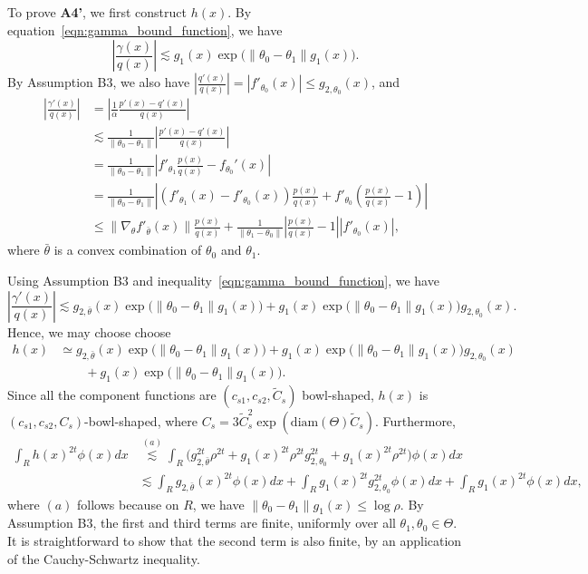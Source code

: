 \documentclass{article}
\begin{document}
To prove \textbf{A4'}, we first construct $h(x)$. By equation~\ref{eqn:gamma_bound_function}, we have
\[
\left| \frac{\gamma(x)}{q(x)} \right| \lesssim
     g_1(x) \exp\Big( \|\theta_0 - \theta_1 \|  g_1(x) \Big).
\]
By Assumption B3, we also have $\left| \frac{q'(x)}{q(x)} \right| = |f'_{\theta_0}(x)| \leq g_{2, \theta_0}(x)$, and
\begin{align*}
\left| \frac{\gamma'(x) }{q(x)} \right| &=
    \left| \frac{1}{\alpha} \frac{p'(x) - q'(x)}{q(x)} \right| \\
%
&\lesssim \frac{1}{\| \theta_0 - \theta_1 \|}\left| \frac{p'(x) - q'(x)}{q(x)}\right|\\
%
& =  \frac{1}{\| \theta_0 - \theta_1 \|} \left|
           f'_{\theta_1} \frac{p(x)}{q(x)} - f_{\theta_0}'(x) \right| \\
  &= \frac{1}{\|\theta_0 - \theta_1\|} \left| 
          ( f'_{\theta_1}(x) - f'_{\theta_0}(x) ) \frac{p(x)}{q(x)} 
       + f'_{\theta_0} \left( \frac{p(x)}{q(x)} - 1 \right) \right| \\
  &\leq \| \nabla_{\theta} f'_{\bar{\theta}}(x) \| \frac{p(x)}{q(x)} 
         + \frac{1}{\| \theta_1 - \theta_0\|} 
        \left| \frac{p(x)}{q(x)} - 1 \right|  |f'_{\theta_0}(x)|,
\end{align*}
where $\bar{\theta}$ is a convex combination of $\theta_0$ and $\theta_1$. 

Using Assumption B3 and inequality~\eqref{eqn:gamma_bound_function}, we have
\[
\left| \frac{\gamma'(x)}{q(x)} \right| \lesssim 
      g_{2,\bar{\theta}}(x) \exp\Big( \| \theta_0 - \theta_1\| g_1(x) \Big)
      +  g_1(x) \exp\Big( \| \theta_0 - \theta_1 \| g_1(x) \Big) g_{2, \theta_0}(x).
\]
Hence, we may choose choose 
\begin{align*}
h(x) & \simeq g_{2,\bar{\theta}}(x) \exp\Big( \| \theta_0 - \theta_1\| g_1(x) \Big)
      +  g_1(x) \exp\Big( \| \theta_0 - \theta_1 \| g_1(x) \Big) g_{2, \theta_0}(x) \\
      & \qquad +  g_1(x) \exp\Big( \| \theta_0 - \theta_1 \| g_1(x) \Big).
\end{align*}
Since all the component functions are $(c_{s1}, c_{s2}, \tilde{C}_s)$ bowl-shaped, $h(x)$ is $(c_{s1}, c_{s2}, C_s)$-bowl-shaped, where 
$C_s = 3 \tilde{C}^2_s \exp( \textrm{diam}(\Theta) \tilde{C}_s)$. Furthermore,
\begin{align*}
\int_R h(x)^{2t} \phi(x) dx &\stackrel{(a)} \lesssim \int_R \Big( g_{2, \bar{\theta}}^{2t} \rho^{2t} + 
               g_1(x)^{2t} \rho^{2t} g_{2, \theta_0}^{2t} + g_1(x)^{2t} \rho^{2t}
              \Big) \phi(x) dx  \\
   & \lesssim \int_R  g_{2, \bar{\theta}}(x)^{2t} \phi(x) dx + 
        \int_R  g_1(x)^{2t} g_{2, \theta_0}^{2t} \phi(x) dx  + 
       \int_R g_1(x)^{2t} \phi(x) dx,
\end{align*}
where $(a)$ follows because on $R$, we have $\| \theta_0 - \theta_1 \| g_1(x) \leq \log \rho$. 
By Assumption B3, the first and third terms are finite, uniformly over all $\theta_1, \theta_0 \in \Theta$. It is straightforward to show that the second term is also finite, by an application of the Cauchy-Schwartz inequality.
\end{document}
